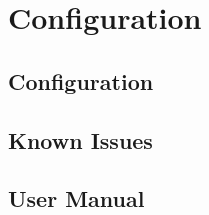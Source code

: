 \documentclass[10pt,a4paper,final]{scrartcl}
\begin{document}
\section{Configuration}
\subsection{Configuration}
	

\subsection{Known Issues}
	

\subsection{User Manual}
	

 
\theendnotes
 
\end{document}
